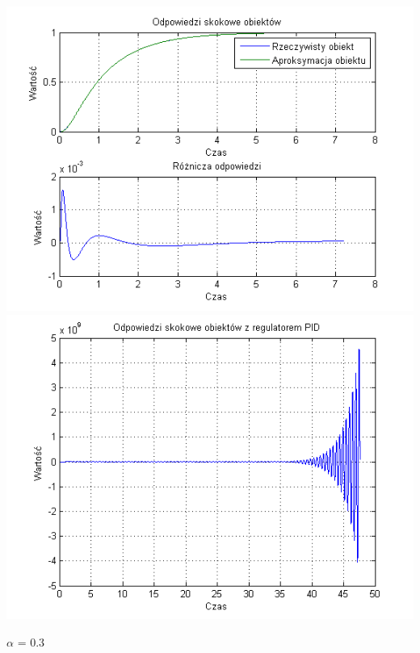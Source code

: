 \documentclass[10pt,a4paper]{article}
\begin{document}
\begin{center}
\includegraphics[scale=1]{images/dwa/skrypt_119.png}\\
\includegraphics[scale=1]{images/dwa/skrypt_120.png}\\
\end{center}
\newpage
$\alpha$ = 0.3
\end{document}
